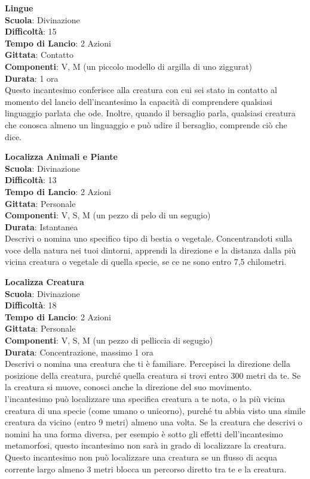 \begin{multicols}{2}
\medskip\textbf{Lingue}\\
\textbf{Scuola}: Divinazione\\
\textbf{Difficoltà}:  15\\
\textbf{Tempo di Lancio}: 2 Azioni\\
\textbf{Gittata}: Contatto\\
\textbf{Componenti}: V, M (un piccolo modello di argilla di uno ziggurat)\\
\textbf{Durata}: 1 ora\\
Questo incantesimo conferisce alla creatura con cui sei stato in contatto al momento del lancio dell'incantesimo la capacità di comprendere qualsiasi linguaggio parlata che ode. Inoltre, quando il bersaglio parla, qualsiasi creatura che conosca almeno un linguaggio e può udire il bersaglio, comprende ciò che dice.

\medskip\textbf{Localizza Animali e Piante}\\
\textbf{Scuola}: Divinazione\\
\textbf{Difficoltà}:  13\\
\textbf{Tempo di Lancio}: 2 Azioni\\
\textbf{Gittata}: Personale\\
\textbf{Componenti}: V, S, M (un pezzo di pelo di un segugio) \\
\textbf{Durata}: Istantanea\\
Descrivi o nomina uno specifico tipo di bestia o vegetale. Concentrandoti sulla voce della natura nei tuoi dintorni, apprendi la direzione e la distanza dalla più vicina creatura o vegetale di quella specie, se ce ne sono entro 7,5 chilometri.

\medskip\textbf{Localizza Creatura}\\
\textbf{Scuola}: Divinazione\\
\textbf{Difficoltà}:  18\\
\textbf{Tempo di Lancio}: 2 Azioni\\
\textbf{Gittata}: Personale\\
\textbf{Componenti}: V, S, M (un pezzo di pelliccia di segugio)\\
\textbf{Durata}: Concentrazione, massimo 1 ora\\
Descrivi o nomina una creatura che ti è familiare. Percepisci la direzione della posizione della creatura, purché quella creatura si trovi entro 300 metri da te. Se la creatura si muove, conosci anche la direzione del suo movimento.\\
l'incantesimo può localizzare una specifica creatura a te nota, o la più vicina creatura di una specie (come umano o unicorno), purché tu abbia visto una simile creatura da vicino (entro 9 metri) almeno una volta. Se la creatura che descrivi o nomini ha una forma diversa, per esempio è sotto gli effetti dell'incantesimo metamorfosi, questo incantesimo non sarà in grado di localizzare la creatura.\\
Questo incantesimo non può localizzare una creatura se un flusso di acqua corrente largo almeno 3 metri blocca un percorso diretto tra te e la creatura.


\end{multicols}
